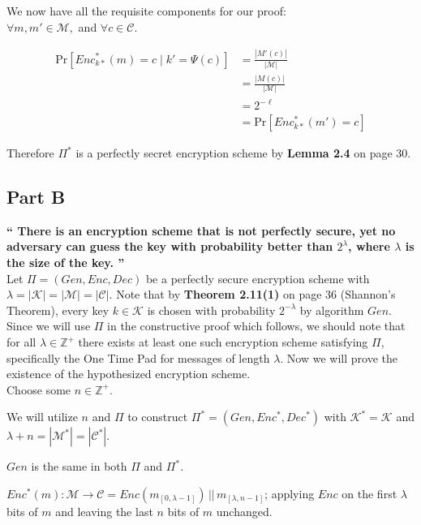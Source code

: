 \documentclass{article}
\newcommand{\HomeworkText}[1]{\textbf{``#1''}\\}
\begin{document}
    
    We now have all the requisite components for our proof:\\
    
    $\forall m,m' \in \mathcal{M},$ and $\forall c \in \mathcal{C}$.
    
   	\begin{equation}
    \begin{split}
    	\text{Pr}[Enc^*_{k*}(m) = c \;|\; k' = \Psi(c)]
    & = \frac{|{M}'(c)|}{|\mathcal{M}|} \\
    & = \frac{|{M}(c)|}{|\mathcal{M}|} \\
    & = 2^{-\ell} \\
    & = \text{Pr}[Enc^*_{k*}(m') = c]
    \end{split}
    \end{equation}
    
    Therefore $\Pi^*$ is a perfectly secret encryption scheme by \textbf{Lemma 2.4} on page 30.
	

	\subsection*{Part B}
	\HomeworkText{
		There is an encryption scheme that is not perfectly secure, yet no adversary can guess the key with probability better than $2^{\lambda}$, where $\lambda$ is the size of the key.
	}

    Let $\Pi = (Gen,Enc,Dec)$ be a perfectly secure encryption scheme with $\lambda = |\mathcal{K}| = |\mathcal{M}| = |\mathcal{C}|$.
    Note that by \textbf{Theorem 2.11(1)} on page 36 (Shannon's Theorem), every key $k \in \mathcal{K}$ is chosen with probability $2^{-\lambda}$ by algorithm $Gen$.
    Since we will use $\Pi$ in the constructive proof which follows, we should note that for all $\lambda \in \mathbb{Z}^{+}$ there exists at least one such encryption scheme satisfying $\Pi$, specifically the One Time Pad for messages of length $\lambda$.
    Now we will prove the existence of the hypothesized encryption scheme.\\ 
    
    Choose some $n \in \mathbb{Z}^{+}$.
    
    We will utilize  $n$ and $\Pi$ to construct $\Pi^{*} = (Gen,Enc^{*},Dec^{*})$ with $\mathcal{K}^{*} = \mathcal{K}$ and $\lambda + n = |\mathcal{M}^{*}| = |\mathcal{C}^{*}|$. 
    
    $Gen$ is the same in both $\Pi$ and $\Pi^{*}$. 
    
    $Enc^{*}(m) : \mathcal{M} \to \mathcal{C} = Enc(m_{[0,\lambda-1]}) \,||\, m_{[\lambda,n-1]}$; applying $Enc$ on the first $\lambda$ bits of $m$ and leaving the last $n$ bits of $m$ unchanged. 
    
\end{document}
